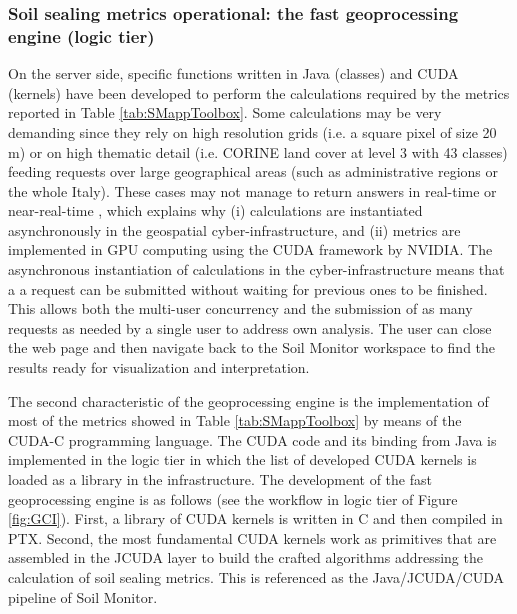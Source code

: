 \documentclass[APA,LATO1COL,doublespace]{WileyNJD-v2}
\begin{document}
\subsubsection{ Soil sealing metrics operational: the fast geoprocessing engine (logic tier) } %
\label{sec:logicTier}
On the server side, specific functions written in Java (classes) and CUDA (kernels) have been developed to perform the calculations required by the metrics reported in Table \ref{tab:SMappToolbox}. 
Some calculations may be very demanding since they rely on high resolution grids (i.e. a square pixel of size 20 m) or on high thematic detail (i.e. CORINE land cover at level 3 with 43 classes) feeding requests over large geographical areas (such as administrative regions or the whole Italy).
These cases may not manage to return answers in real-time or near-real-time
, which explains why 
(i) calculations are instantiated asynchronously in the geospatial cyber-infrastructure, and
(ii) metrics are implemented in GPU computing using the CUDA framework by NVIDIA.
The asynchronous instantiation of calculations in the cyber-infrastructure means that a a request can be submitted without waiting for previous ones to be finished.
This allows both the multi-user concurrency and the submission of as many requests as needed by a single user to address own analysis.
The user can close the web page and then navigate back to the Soil Monitor workspace to find the results ready for visualization and interpretation.

The second characteristic of the geoprocessing engine is the implementation of most of the metrics showed in Table \ref{tab:SMappToolbox} by means of the CUDA-C programming language.
The CUDA code and its binding from Java is implemented in the logic tier in which %
the list of developed CUDA kernels is loaded as a library in the infrastructure.
The development of the fast geoprocessing engine is as follows (see the workflow in logic tier of Figure \ref{fig:GCI}).
First, a library of CUDA kernels is written in C and then compiled in PTX. 
Second, the most fundamental CUDA kernels work as primitives that are assembled in the JCUDA layer to build the crafted algorithms  addressing the calculation of soil sealing metrics.
This is referenced as the Java/JCUDA/CUDA pipeline of Soil Monitor.%
\end{document}
